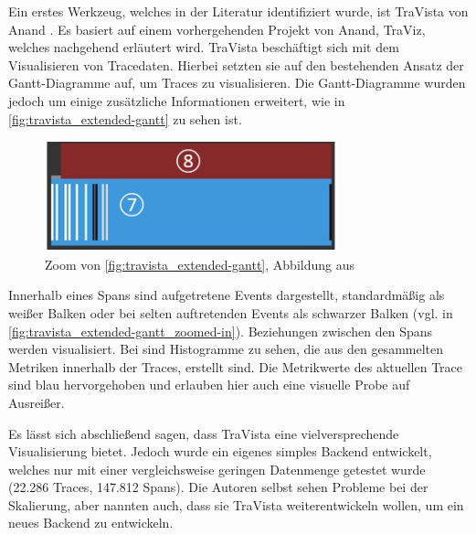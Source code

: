 Ein erstes Werkzeug, welches in der Literatur identifiziert wurde, ist TraVista von Anand \etal \cite{TraVistaPaper}. Es basiert auf einem vorhergehenden Projekt von Anand, TraViz, welches nachgehend erläutert wird. TraVista beschäftigt sich mit dem Visualisieren von Tracedaten. Hierbei setzten sie auf den bestehenden Ansatz der Gantt-Diagramme auf, um Traces zu visualisieren. Die Gantt-Diagramme wurden jedoch um einige zusätzliche Informationen erweitert, wie in \autoref{fig:travista_extended-gantt} zu sehen ist.

\begin{figure}
\centering
\vspace{-1.5\baselineskip}
\includegraphics[width=\linewidth]{img/03_methoden/travista_extended-gantt_zoomed-in.png}
\caption{Zoom von \autoref{fig:travista_extended-gantt}, Abbildung aus \cite{TraVistaPaper}}
\label{fig:travista_extended-gantt_zoomed-in}
\end{figure}

Innerhalb eines Spans sind aufgetretene Events dargestellt, standardmäßig als weißer Balken oder bei selten auftretenden Events als schwarzer Balken (vgl.  in \autoref{fig:travista_extended-gantt_zoomed-in}). Beziehungen  zwischen den Spans werden visualisiert. Bei  sind Histogramme zu sehen, die aus den gesammelten Metriken innerhalb der Traces, erstellt sind. Die Metrikwerte des aktuellen Trace sind blau hervorgehoben und erlauben hier auch eine visuelle Probe auf Ausreißer.

Es lässt sich abschließend sagen, dass TraVista eine vielversprechende Visualisierung bietet. Jedoch wurde ein eigenes simples Backend entwickelt, welches nur mit einer vergleichsweise geringen Datenmenge getestet wurde (22.286 Traces, 147.812 Spans). Die Autoren selbst sehen Probleme bei der Skalierung, aber nannten auch, dass sie TraVista weiterentwickeln wollen, um ein neues Backend zu entwickeln.

